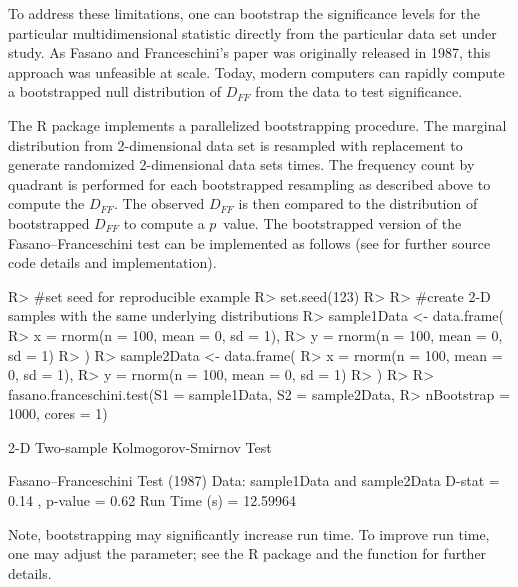 \documentclass[codesnippet]{jss}
\newcommand{\fct}[1]{\code{#1()}}
\begin{document}
To address these limitations, one can bootstrap the significance levels for the particular multidimensional statistic directly from the particular data set under study. As Fasano and Franceschini's paper was originally released in 1987, this approach was unfeasible at scale.  Today, modern computers can rapidly compute a bootstrapped null distribution of $D_{FF}$ from the data to test significance.

The  R package implements a parallelized bootstrapping procedure. The marginal distribution from 2-dimensional data set is resampled with replacement to generate randomized 2-dimensional data sets  times. The frequency count by quadrant is performed for each bootstrapped resampling as described above to compute the $D_{FF}$. The observed $D_{FF}$ is then compared to the distribution of bootstrapped $D_{FF}$ to compute a $p$~value. The bootstrapped version of the Fasano--Franceschini test can be implemented as follows (see \fct{fasano.franceschini.test} for further source code details and implementation).

\begin{CodeChunk}
\begin{CodeInput}
R> #set seed for reproducible example
R> set.seed(123)
R>
R> #create 2-D samples with the same underlying distributions
R> sample1Data <- data.frame(
R>  x = rnorm(n = 100, mean = 0, sd = 1),
R>  y = rnorm(n = 100, mean = 0, sd = 1)
R> )
R> sample2Data <- data.frame(
R>  x = rnorm(n = 100, mean = 0, sd = 1),
R>  y = rnorm(n = 100, mean = 0, sd = 1)
R> )
R>
R> fasano.franceschini.test(S1 = sample1Data, S2 = sample2Data,
R>                          nBootstrap = 1000, cores = 1)
\end{CodeInput}
\begin{CodeOutput}
      2-D Two-sample Kolmogorov-Smirnov Test

 Fasano--Franceschini Test (1987)
 Data:  sample1Data and sample2Data
 D-stat =  0.14 , p-value =  0.62
 Run Time (s) =  12.59964
\end{CodeOutput}
\end{CodeChunk}

Note, bootstrapping may significantly increase run time. To improve run time, one may adjust the  parameter; see the R  package and the \fct{mclapply} function for further details.
\end{document}
